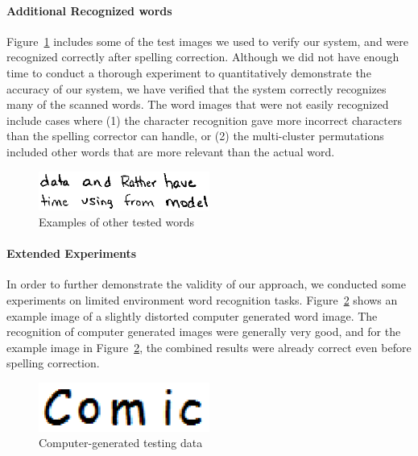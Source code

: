 \documentclass[12pt]{article}
\begin{document}
	\paragraph{Additional Recognized words} Figure~\ref{figure:examples} includes some of the test images we used to verify our system, and were recognized correctly after spelling correction. Although we did not have enough time to conduct a thorough experiment to quantitatively demonstrate the accuracy of our system, we have verified that the system correctly recognizes many of the scanned words. The word images that were not easily recognized include cases where (1) the character recognition gave more incorrect characters than the spelling corrector can handle, or (2) the multi-cluster permutations included other words that are more relevant than the actual word.
	
	\begin{figure}[htbp!]
	\centering
	\includegraphics[width=0.5\textwidth]{examples.eps}
	\caption{Examples of other tested words}
	\label{figure:examples}
	\end{figure}
	
	\paragraph{Extended Experiments} In order to further demonstrate the validity of our approach, we conducted some experiments on limited environment word recognition tasks. Figure~\ref{figure:comic_comp} shows an example image of a slightly distorted computer generated word image. The recognition of computer generated images were generally very good, and for the example image in Figure~\ref{figure:comic_comp}, the combined results were already correct even before spelling correction. 
	
	\begin{figure}[htbp!]
	\centering
	\includegraphics[width=0.5\textwidth]{comic_comp.eps}
	\caption{Computer-generated testing data}
	\label{figure:comic_comp}
	\end{figure}
	
\end{document}
